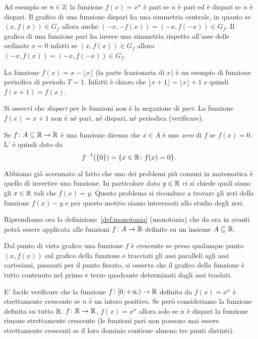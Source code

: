 Ad esempio se $n\in {\mathbb Z}$ la funzione $f(x)=x^n$
è pari se $n$ è pari ed è dispari se $n$ è dispari.
Il grafico di una funzione dispari ha una simmetria
centrale, in quanto se $(x,f(x))\in G_f$ allora
anche $(-x,-f(x)) = (-x,f(-x))\in G_f$.
Il grafico di una funzione pari ha invece una
simmetria rispetto all'asse delle ordinate $x=0$
infatti se $(x,f(x))\in G_f$ allora $(-x,f(x)) = (-x,f(-x)) \in G_f$.

La funzione $f(x) = x - \lfloor x\rfloor$ (la parte frazionaria di $x$)
è un esempio di funzione periodica di periodo $T=1$. Infatti
è chiaro che $\lfloor x+1\rfloor = \lfloor x \rfloor +1$ e quindi
$f(x+1)=f(x)$.

Si osservi che \emph{dispari} per le funzioni non è la negazione
di \emph{pari}.
La funzione $f(x) = x+1$ non è né pari, né dispari, né periodica
(verificare).

\begin{definition}[zeri]
  Se $f\colon A\subseteq {\mathbb R} \to {\mathbb R}$ è una funzione diremo che
  $x\in A$ è uno \emph{zero} di $f$ se $f(x)=0$.
  L'
  è quindi dato da
  \[
    f^{-1}({\left\{ 0 \right\}}) = {\left\{ x\in {\mathbb R}\colon f(x) = 0 \right\}}.
  \]
\end{definition}

Abbiamo già accennato al fatto che uno dei problemi più comuni in
matematica è quello di invertire una funzione. In particolare 
dato $y\in {\mathbb R}$ ci si chiede quali siano gli $x\in {\mathbb R}$ 
tali che $f(x)=y$. 
Questo problema si riconduce
a trovare gli zeri della funzione $f(x)-y$ e per questo motivo 
siamo interessati allo studio degli zeri.

Riprendiamo ora la definizione~\ref{def:monotonia} (monotonia) che da ora in avanti 
potrà essere applicata alle funzioni $f\colon A \to {\mathbb R}$ definite 
su un insieme $A\subseteq {\mathbb R}$.

Dal punto di vista grafico una funzione $f$ è crescente
se preso qualunque punto $(x,f(x))$ sul grafico della funzione
e tracciati gli assi paralleli agli assi cartesiani, passanti
per il punto fissato, si osserva che il grafico della funzione
è tutto contenuto nel primo e terzo quadrante determinati
dagli assi traslati.

E' facile verificare che la funzione $f\colon [0,+\infty)\to {\mathbb R}$
definita da $f(x)=x^n$
è strettamente crescente se $n$ è un intero positivo.
Se però consideriamo la funzione definita su tutto
${\mathbb R}$: $f\colon {\mathbb R} \to {\mathbb R}$,
$f(x)=x^n$ allora solo se $n$ è dispari la funzione rimane
strettamente crescente
(le funzioni pari non possono mai essere strettamente crescenti se
il loro dominio contiene almeno tre punti distinti).

